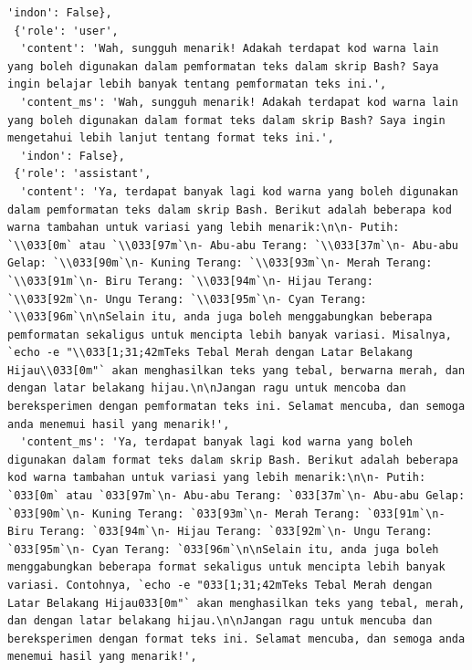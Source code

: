 \documentclass{article}
\begin{document}
\begin{lstlisting}[breaklines=true]
  'indon': False},
 {'role': 'user',
  'content': 'Wah, sungguh menarik! Adakah terdapat kod warna lain yang boleh digunakan dalam pemformatan teks dalam skrip Bash? Saya ingin belajar lebih banyak tentang pemformatan teks ini.',
  'content_ms': 'Wah, sungguh menarik! Adakah terdapat kod warna lain yang boleh digunakan dalam format teks dalam skrip Bash? Saya ingin mengetahui lebih lanjut tentang format teks ini.',
  'indon': False},
 {'role': 'assistant',
  'content': 'Ya, terdapat banyak lagi kod warna yang boleh digunakan dalam pemformatan teks dalam skrip Bash. Berikut adalah beberapa kod warna tambahan untuk variasi yang lebih menarik:\n\n- Putih: `\\033[0m` atau `\\033[97m`\n- Abu-abu Terang: `\\033[37m`\n- Abu-abu Gelap: `\\033[90m`\n- Kuning Terang: `\\033[93m`\n- Merah Terang: `\\033[91m`\n- Biru Terang: `\\033[94m`\n- Hijau Terang: `\\033[92m`\n- Ungu Terang: `\\033[95m`\n- Cyan Terang: `\\033[96m`\n\nSelain itu, anda juga boleh menggabungkan beberapa pemformatan sekaligus untuk mencipta lebih banyak variasi. Misalnya, `echo -e "\\033[1;31;42mTeks Tebal Merah dengan Latar Belakang Hijau\\033[0m"` akan menghasilkan teks yang tebal, berwarna merah, dan dengan latar belakang hijau.\n\nJangan ragu untuk mencoba dan bereksperimen dengan pemformatan teks ini. Selamat mencuba, dan semoga anda menemui hasil yang menarik!',
  'content_ms': 'Ya, terdapat banyak lagi kod warna yang boleh digunakan dalam format teks dalam skrip Bash. Berikut adalah beberapa kod warna tambahan untuk variasi yang lebih menarik:\n\n- Putih: `033[0m` atau `033[97m`\n- Abu-abu Terang: `033[37m`\n- Abu-abu Gelap: `033[90m`\n- Kuning Terang: `033[93m`\n- Merah Terang: `033[91m`\n- Biru Terang: `033[94m`\n- Hijau Terang: `033[92m`\n- Ungu Terang: `033[95m`\n- Cyan Terang: `033[96m`\n\nSelain itu, anda juga boleh menggabungkan beberapa format sekaligus untuk mencipta lebih banyak variasi. Contohnya, `echo -e "033[1;31;42mTeks Tebal Merah dengan Latar Belakang Hijau033[0m"` akan menghasilkan teks yang tebal, merah, dan dengan latar belakang hijau.\n\nJangan ragu untuk mencuba dan bereksperimen dengan format teks ini. Selamat mencuba, dan semoga anda menemui hasil yang menarik!',

\end{lstlisting}
\end{document}

